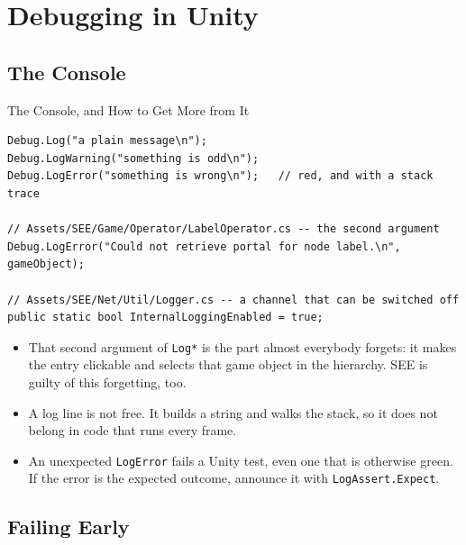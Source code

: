 
\section{Debugging in Unity}



\subsection{The Console}

\begin{frame}[fragile]{The Console, and How to Get More from It}
  \begin{lstlisting}[basicstyle=\scriptsize\ttfamily]
Debug.Log("a plain message\n");
Debug.LogWarning("something is odd\n");
Debug.LogError("something is wrong\n");   // red, and with a stack trace

// Assets/SEE/Game/Operator/LabelOperator.cs -- the second argument
Debug.LogError("Could not retrieve portal for node label.\n", gameObject);

// Assets/SEE/Net/Util/Logger.cs -- a channel that can be switched off
public static bool InternalLoggingEnabled = true;
  \end{lstlisting}
  \vspace{1ex}

  \begin{itemize}
    \item That second argument of \texttt{Log*} is the part almost everybody forgets: it makes
      the entry clickable and selects that game object in the hierarchy. SEE
      is guilty of this forgetting, too.
    \item A log line is not free. It builds a string and walks the stack, so
      it does not belong in code that runs every frame.
    \item An unexpected \texttt{LogError} fails a Unity test, even one that is
      otherwise green. If the error is the expected outcome, announce it with
      \texttt{LogAssert.Expect}.
  \end{itemize}
\end{frame}

\subsection{Failing Early}

